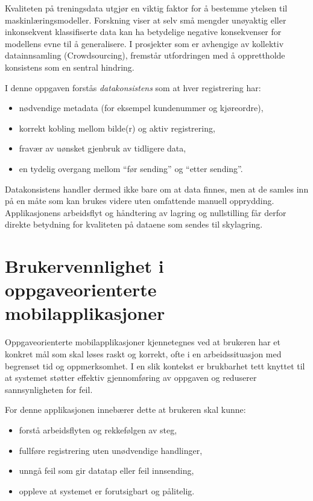 Kvaliteten på treningsdata utgjør en viktig faktor for å bestemme ytelsen til maskinlæringsmodeller. Forskning viser at selv små mengder unøyaktig eller inkonsekvent klassifiserte data kan ha betydelige negative konsekvenser for modellens evne til å generalisere. I prosjekter som er avhengige av kollektiv datainnsamling (Crowdsourcing), fremstår utfordringen med å opprettholde konsistens som en sentral hindring.


I denne oppgaven forstås \textit{datakonsistens} som at hver registrering har:
\begin{itemize}
    \item nødvendige metadata (for eksempel kundenummer og kjøreordre),
    \item korrekt kobling mellom bilde(r) og aktiv registrering,
    \item fravær av uønsket gjenbruk av tidligere data,
    \item en tydelig overgang mellom ``før sending'' og ``etter sending''.
\end{itemize}

Datakonsistens handler dermed ikke bare om at data finnes, men at de samles inn på en måte som kan brukes videre uten omfattende manuell opprydding. Applikasjonens arbeidsflyt og håndtering av lagring og nullstilling får derfor direkte betydning for kvaliteten på dataene som sendes til skylagring.

\section{Brukervennlighet i oppgaveorienterte mobilapplikasjoner}
Oppgaveorienterte mobilapplikasjoner kjennetegnes ved at brukeren har et konkret mål som skal løses raskt og korrekt, ofte i en arbeidssituasjon med begrenset tid og oppmerksomhet. I en slik kontekst er brukbarhet tett knyttet til at systemet støtter effektiv gjennomføring av oppgaven og reduserer sannsynligheten for feil.

For denne applikasjonen innebærer dette at brukeren skal kunne:
\begin{itemize}
    \item forstå arbeidsflyten og rekkefølgen av steg,
    \item fullføre registrering uten unødvendige handlinger,
    \item unngå feil som gir datatap eller feil innsending,
    \item oppleve at systemet er forutsigbart og pålitelig.
\end{itemize}

